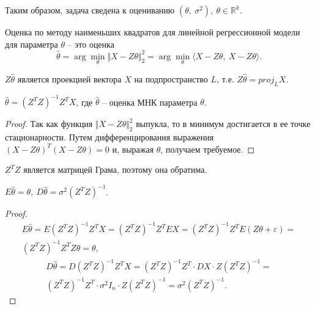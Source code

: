Таким образом, задача сведена к оцениванию $\displaystyle \left( \theta ,\ \sigma ^{2}\right) ,\ \theta \in \mathbb{R}^{k}$.
\begin{definition}
    Оценка по методу наименьших квадратов для линейной регрессионной модели для параметра $\displaystyle \theta $ -- это оценка
    \begin{equation*}
        \hat{\theta } =\arg\min_{\theta }\Vert X-Z\theta \Vert _{2}^{2} =\arg\min_{\theta }\langle X-Z\theta ,\ X-Z\theta \rangle .
    \end{equation*}
\end{definition}
\begin{note}
    $\displaystyle Z\hat{\theta }$ является проекцией вектора $\displaystyle X$ на подпространство $\displaystyle L$, т.е. $\displaystyle Z\hat{\theta } =proj_{L} X$.
\end{note}
\begin{lemma}
    $\displaystyle \hat{\theta } =\left( Z^{T} Z\right)^{-1} Z^{T} X$, где $\displaystyle \hat{\theta }$ -- оценка МНК параметра $\displaystyle \theta $.
\end{lemma}
\begin{proof}
    Так как функция $\displaystyle \Vert X-Z\theta \Vert _{2}^{2}$ выпукла, то в минимум достигается в ее точке стационарности. Путем дифференцирования выражения $\displaystyle ( X-Z\theta )^{T}( X-Z\theta ) =0$ и, выражая $\displaystyle \theta $, получаем требуемое.
\end{proof}
\begin{note}
    $\displaystyle Z^{T} Z$ является матрицей Грама, поэтому она обратима.
\end{note}
\begin{proposition}
    $\displaystyle E\hat{\theta } =\theta ,\ D\hat{\theta } =\sigma ^{2}\left( Z^{T} Z\right)^{-1}$.
\end{proposition}
\begin{proof}
    \begin{gather*}
        E\hat{\theta } =E\left( Z^{T} Z\right)^{-1} Z^{T} X=\left( Z^{T} Z\right)^{-1} Z^{T} EX=\left( Z^{T} Z\right)^{-1} Z^{T} E( Z\theta +\varepsilon ) =\\
        \left( Z^{T} Z\right)^{-1} Z^{T} Z\theta =\theta ,
    \end{gather*}
    \begin{gather*}
        D\hat{\theta } =D\left( Z^{T} Z\right)^{-1} Z^{T} X=\left( Z^{T} Z\right)^{-1} Z^{T} \cdotp DX\cdotp Z\left( Z^{T} Z\right)^{-1} =\\
        \left( Z^{T} Z\right)^{-1} Z^{T} \cdotp \sigma ^{2} I_{n} \cdotp Z\left( Z^{T} Z\right)^{-1} =\sigma ^{2}\left( Z^{T} Z\right)^{-1} .
    \end{gather*}
\end{proof}
